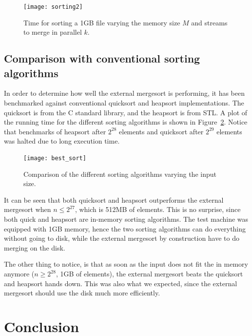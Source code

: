 \documentclass[a4paper,12pt]{article}
\begin{document}
\begin{figure}[h!]
  \centering
  \texttt{[image: sorting2]}
  \caption{Time for sorting a 1GB file varying the memory size $M$ and
    streams to merge in parallel $k$.}
  \label{fig:sorting}
\end{figure}

\subsection{Comparison with conventional sorting algorithms}
In order to determine how well the external mergesort is performing,
it has been benchmarked against conventional quicksort and heapsort
implementations. The quicksort is from the C standard library, and
the heapsort is from STL. A plot of the running time for the
different sorting algorithms is shown in Figure~\ref{fig:best-sort}. Notice that benchmarks of heapsort after $2^{28}$ elements and quicksort after $2^{29}$ elements was halted due to long execution time.

\begin{figure}[h!]
  \centering
  \texttt{[image: best\_sort]}
  \caption{Comparison of the different sorting algorithms varying the input size.}
  \label{fig:best-sort}
\end{figure}

It can be seen that both quicksort and heapsort outperforms the
external mergesort when $n \leq 2^{27}$, which is 512MB of
elements. This is no surprise, since both quick and heapsort are
in-memory sorting algorithms. The test machine was equipped with 1GB memory, hence
the two sorting algorithms can do everything without going to disk,
while the external mergesort by construction have to do merging on
the disk.

The other thing to notice, is that as soon as the input does not fit
the in memory anymore ($n \geq 2^{28}$, 1GB of elements), the external
mergesort beats the quicksort and heapsort hands down. This was also
what we expected, since the external mergesort should use the disk
much more efficiently.

\section{Conclusion}


\clearpage{}
\end{document}
